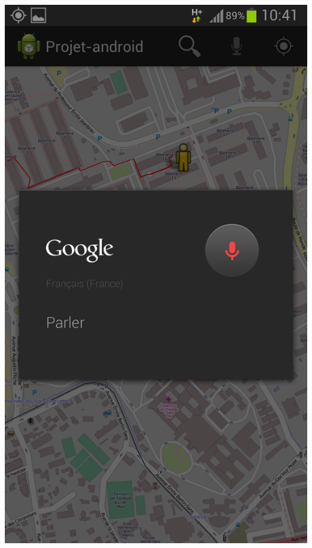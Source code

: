 \documentclass{article}
\begin{document}
	\begin{center}
		\includegraphics[scale=0.25]{recherche.png}
	\end{center}
	
\end{document}
